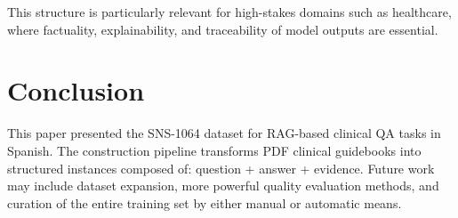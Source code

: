 \documentclass[11pt,a4paper]{article}
\begin{document}
This structure is particularly relevant for high-stakes domains such as healthcare, where factuality, explainability, and traceability of model outputs are essential.

\section{Conclusion}

This paper presented the SNS-1064 dataset for RAG-based clinical QA tasks in Spanish. The construction pipeline transforms PDF clinical guidebooks into structured instances composed of: question + answer + evidence. Future work may include dataset expansion, more powerful quality evaluation methods, and curation of the entire training set by either manual or automatic means.





\end{document}
